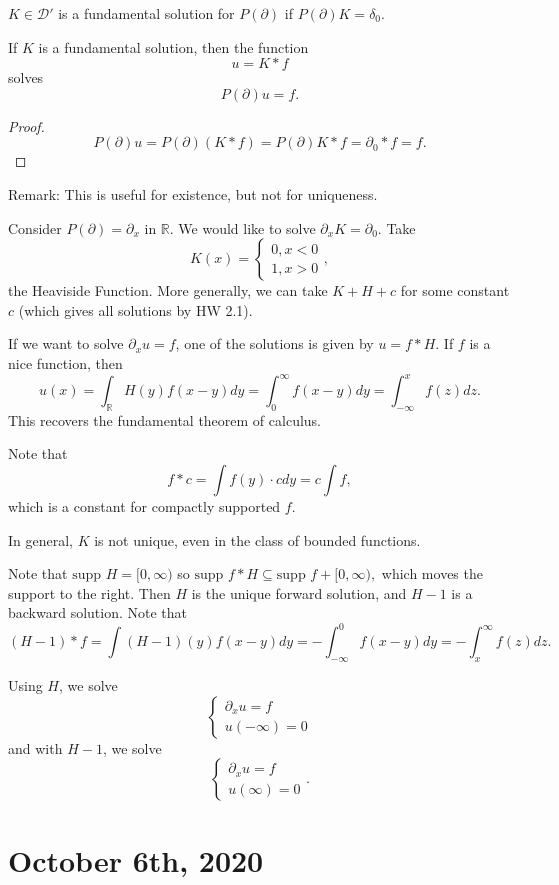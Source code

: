 \documentclass[12pt]{scrartcl}
\newcommand{\R}{\mathbb{R}}
\newcommand{\supp}{\text{supp }}
\begin{document}
\begin{definition} $K \in \mathcal D'$ is a fundamental solution for $P(\partial)$ if $P(\partial) K = \delta_0$.
\end{definition}
\begin{proposition} If $K$ is a fundamental solution, then the function $$u = K*f$$ solves $$P(\partial)u = f.$$
\end{proposition}
\begin{proof}
$$P(\partial)u = P(\partial)(K*f) = P(\partial)K * f = \partial_0 * f = f.$$
\end{proof}
Remark:  This is useful for existence, but not for uniqueness.
\begin{example}
Consider $P(\partial) = \partial_x$ in $\R$.  We would like to solve $\partial_x K = \partial_0$.  Take $$K(x) = \begin{cases} 0, x < 0 \\1, x > 0 \end{cases},$$
the Heaviside Function.  More generally, we can take $K + H+c$ for some constant $c$ (which gives all solutions by HW 2.1).

If we want to solve $\partial_x u = f$, one of the solutions is given by $u = f * H$.  If $f$ is a nice function, then
$$u(x) = \int_\R H(y)f(x-y)dy = \int_{0}^{\infty}f(x-y)dy = \int_{-\infty}^x f(z)dz.$$
This recovers the fundamental theorem of calculus.

Note that 
$$f * c = \int f(y)\cdot c dy = c \int f,$$
which is a constant for compactly supported $f$.
\end{example}
In general, $K$ is not unique, even in the class of bounded functions.  

Note that $\supp H = [0, \infty)$ so $\supp f * H \subseteq \supp f + [0, \infty),$ which moves the support to the right.  Then $H$ is the unique forward solution, and $H-1$ is a backward solution.  Note that
$$(H-1) * f = \int (H-1)(y)f(x-y)dy = - \int_{-\infty}^0 f(x-y)dy = - \int_x^\infty f(z)dz.$$

Using $H$, we solve 
$$\begin{cases} \partial_x u = f \\ u(-\infty) = 0 \end{cases}$$
and with $H-1$, we solve
$$\begin{cases} \partial_x u = f \\ u(\infty) = 0 \end{cases}.$$
\pagebreak
\section{October 6th, 2020}
\end{document}
